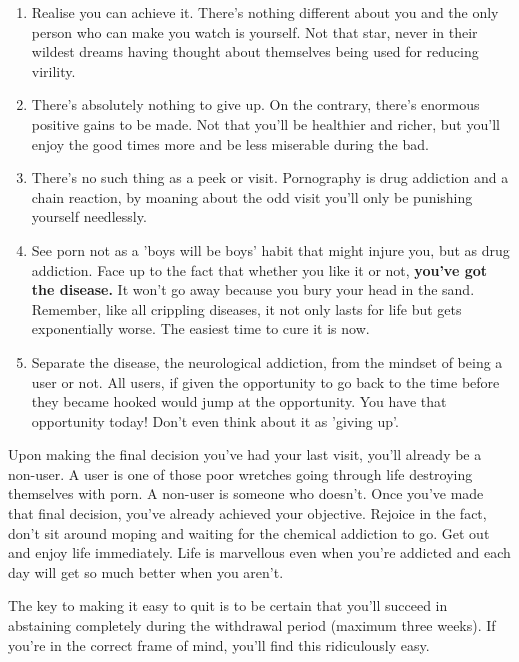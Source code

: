\documentclass[easypeasy]{subfiles}
\begin{document}
\begin{enumerate}
  \item Realise you can achieve it. There's nothing different about you and the only person who can make you watch is yourself. Not that star, never in their wildest dreams having thought about themselves being used for reducing virility.
  \item There's absolutely nothing to give up. On the contrary, there's enormous positive gains to be made. Not that you'll be healthier and richer, but you'll enjoy the good times more and be less miserable during the bad.
  \item There's no such thing as a peek or visit. Pornography is drug addiction and a chain reaction, by moaning about the odd visit you'll only be punishing yourself needlessly.
  \item See porn not as a 'boys will be boys' habit that might injure you, but as drug addiction. Face up to the fact that whether you like it or not, \textbf{you've got the disease.} It won't go away because you bury your head in the sand. Remember, like all crippling diseases, it not only lasts for life but gets exponentially worse. The easiest time to cure it is now.
  \item Separate the disease, the neurological addiction, from the mindset of being a user or not. All users, if given the opportunity to go back to the time before they became hooked would jump at the opportunity. You have that opportunity today! Don't even think about it as 'giving up'.

\end{enumerate}

Upon making the final decision you've had your last visit, you'll already be a non-user. A user is one of those poor wretches going through life destroying themselves with porn. A non-user is someone who doesn't. Once you've made that final decision, you've already achieved your objective. Rejoice in the fact, don't sit around moping and waiting for the chemical addiction to go. Get out and enjoy life immediately. Life is marvellous even when you're addicted and each day will get so much better when you aren't.

The key to making it easy to quit is to be certain that you'll succeed in abstaining completely during the withdrawal period (maximum three weeks). If you're in the correct frame of mind, you'll find this ridiculously easy.
\end{document}
